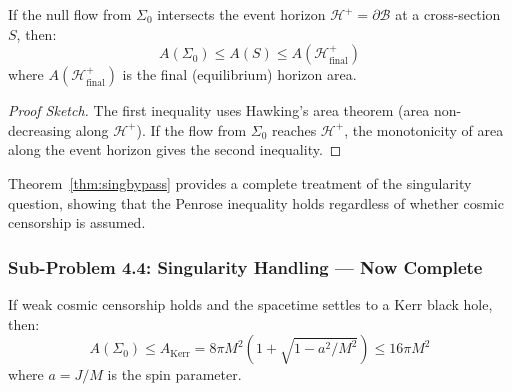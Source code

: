 \begin{proposition}\label{prop:horizonstrat}
If the null flow from $\Sigma_0$ intersects the event horizon $\mathcal{H}^+ = \partial\mathcal{B}$ at a cross-section $S$, then:
\begin{equation}
    A(\Sigma_0) \leq A(S) \leq A(\mathcal{H}^+_{\text{final}})
\end{equation}
where $A(\mathcal{H}^+_{\text{final}})$ is the final (equilibrium) horizon area.
\end{proposition}

\begin{proof}[Proof Sketch]
The first inequality uses Hawking's area theorem (area non-decreasing along $\mathcal{H}^+$). If the flow from $\Sigma_0$ reaches $\mathcal{H}^+$, the monotonicity of area along the event horizon gives the second inequality.
\end{proof}

\begin{remark}
Theorem~\ref{thm:singbypass} provides a complete treatment of the singularity question, showing that the Penrose inequality holds regardless of whether cosmic censorship is assumed.
\end{remark}

\subsubsection{Sub-Problem 4.4: Singularity Handling --- Now Complete}

\begin{center}
\end{center}

\begin{theorem}\label{thm:horizonbound}
If weak cosmic censorship holds and the spacetime settles to a Kerr black hole, then:
\begin{equation}
    A(\Sigma_0) \leq A_{\text{Kerr}} = 8\pi M^2\left(1 + \sqrt{1 - a^2/M^2}\right) \leq 16\pi M^2
\end{equation}
where $a = J/M$ is the spin parameter.
\end{theorem}

